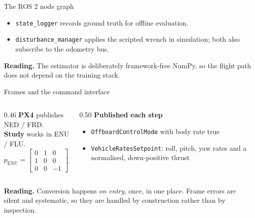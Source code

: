 \documentclass[10pt]{beamer}
\newcommand{\takeaway}[1]{\par\vfill{\footnotesize\textbf{Reading.} #1\par}}
\begin{document}
\begin{frame}{The ROS 2 node graph}
  \centering
  \vspace{3pt}
  \begin{itemize}
    \footnotesize
    \item \texttt{state\_logger} records ground truth for offline evaluation.
    \item \texttt{disturbance\_manager} applies the scripted wrench in
      simulation; both also subscribe to the odometry bus.
  \end{itemize}
  \takeaway{The estimator is deliberately framework-free NumPy, so the flight
    path does not depend on the training stack.}
\end{frame}

\begin{frame}{Frames and the command interface}
  \begin{columns}[T]
    \begin{column}{0.46\textwidth}
      \small
      \textbf{PX4} publishes NED / FRD.\\[2pt]
      \textbf{Study} works in ENU / FLU.
      \[
        p_{\mathrm{ENU}}=\begin{bmatrix}0&1&0\\1&0&0\\0&0&-1\end{bmatrix}
        p_{\mathrm{NED}}
      \]
    \end{column}
    \begin{column}{0.50\textwidth}
      \small
      \textbf{Published each step}
      \begin{itemize}
        \footnotesize
        \item \texttt{OffboardControlMode} with body rate true
        \item \texttt{VehicleRatesSetpoint}: roll, pitch, yaw rates and a
          normalised, down-positive thrust
      \end{itemize}
    \end{column}
  \end{columns}
  \takeaway{Conversion happens \emph{on entry}, once, in one place. Frame
    errors are silent and systematic, so they are handled by construction
    rather than by inspection.}
\end{frame}
\end{document}
